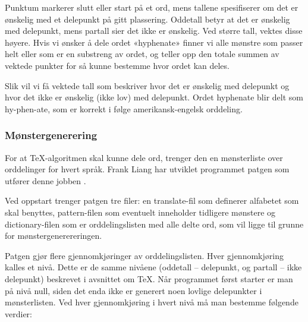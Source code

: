 
Punktum markerer slutt eller start på et ord, mens tallene spesifiserer om det er ønskelig med et delepunkt på gitt plassering. Oddetall betyr at det er ønskelig med delepunkt, mens partall sier det ikke er ønskelig. Ved større tall, vektes disse høyere. Hvis vi ønsker å dele ordet «hyphenate» finner vi alle mønstre som passer helt eller som er en substreng av ordet, og teller opp den totale summen av vektede punkter for så kunne bestemme hvor ordet kan deles.

\newline
{}\newline
{}\newline
{}\newline
{}\newline
{}\newline
{}\newline
{}\newline
{}

Slik vil vi få vektede tall som beskriver hvor det er ønskelig med delepunkt og hvor det ikke er ønskelig (ikke lov) med delepunkt. Ordet hyphenate blir delt som hy-phen-ate, som er korrekt i følge amerikansk-engelsk orddeling.

\subsubsection{Mønstergenerering}

For at \TeX{}-algoritmen skal kunne dele ord, trenger den en mønsterliste over orddelinger for hvert språk. Frank Liang har utviklet programmet patgen som utfører denne jobben \cite{liang1983word}.

Ved oppstart trenger patgen tre filer: en translate-fil som definerer alfabetet som skal benyttes, pattern-filen som eventuelt inneholder tidligere mønstere og dictionary-filen som er orddelingslisten med alle delte ord, som vil ligge til grunne for mønstergenerereringen. 

Patgen gjør flere gjennomkjøringer av orddelingslisten. Hver gjennomkjøring kalles et nivå. Dette er de samme nivåene (oddetall -- delepunkt, og partall -- ikke delepunkt) beskrevet i avsnittet om \TeX{}. Når programmet først starter er man på nivå null, siden det enda ikke er generert noen lovlige delepunkter i mønsterlisten. Ved hver gjennomkjøring i hvert nivå må man bestemme følgende verdier:


